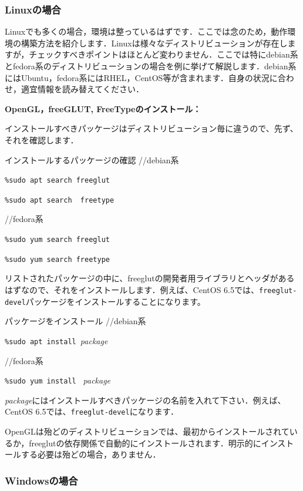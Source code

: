 \documentclass[platex,a4paper,12pt]{jsarticle}%
\begin{document}
\subsubsection{Linuxの場合}

Linuxでも多くの場合，環境は整っているはずです．ここでは念のため，動作環境の構築方法を紹介します．Linuxは様々なディストリビューションが存在しますが，チェックすべきポイントはほとんど変わりません．ここでは特にdebian系とfedora系のディストリビューションの場合を例に挙げて解説します．debian系にはUbuntu，fedora系にはRHEL，CentOS等が含まれます．自身の状況に合わせ，適宜情報を読み替えてください．

{\bf OpenGL，freeGLUT, FreeTypeのインストール：}

インストールすべきパッケージはディストリビューション毎に違うので、先ず、それを確認します．

\begin{itembox}[l]{インストールするパッケージの確認}
	//debian系

	\verb|%sudo apt search freeglut|
	
	\verb|%sudo apt search  freetype|

	//fedora系

	\verb|%sudo yum search freeglut|
	
	\verb|%sudo yum search freetype|
	
\end{itembox}

リストされたパッケージの中に、freeglutの開発者用ライブラリとヘッダがあるはずなので、それをインストールします．例えば、CentOS 6.5では、\verb|freeglut-devel|パッケージをインストールすることになります。

\begin{itembox}[l]{パッケージをインストール}
	//debian系

	\verb|%sudo apt install |{\it package}

	//fedora系

	\verb|%sudo yum install | {\it package}
\end{itembox}

{\it package}にはインストールすべきパッケージの名前を入れて下さい．例えば、CentOS 6.5では、\verb|freeglut-devel|になります．

OpenGLは殆どのディストリビューションでは、最初からインストールされているか，freeglutの依存関係で自動的にインストールされます．明示的にインストールする必要は殆どの場合，ありません．

\subsubsection{Windowsの場合}
\end{document}
